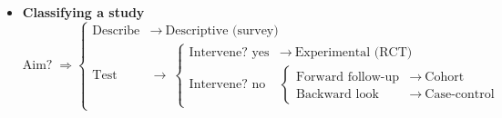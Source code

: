 \documentclass[12pt]{book}
\begin{document}
\begin{itemize}
  \item \textbf{Classifying a study}  
        \[\text{Aim?}\;\Rightarrow
          \begin{cases}
            \text{Describe} &\to\ \text{Descriptive (survey)}\\
            \text{Test} &\to\ 
              \begin{cases}
                \text{Intervene? yes} &\to\ \text{Experimental (RCT)}\\
                \text{Intervene? no} &
                  \begin{cases}
                    \text{Forward follow-up} &\to\ \text{Cohort}\\
                    \text{Backward look} &\to\ \text{Case-control}
                  \end{cases}
              \end{cases}
          \end{cases}
        \]

\end{itemize}


\newpage
\thispagestyle{empty}
\mbox{}
\newpage
\end{document}
